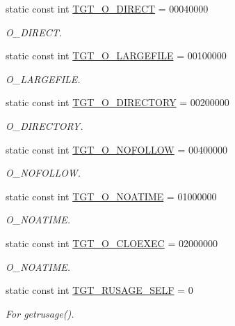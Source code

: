 \begin{DoxyCompactItemize}
static const int \hyperlink{classArmLinux64_ae5d685a6a2ee8c6fe0ede370f0bec588}{TGT\_\-O\_\-DIRECT} = 00040000
\begin{DoxyCompactList}\small\item\em O\_\-DIRECT. \item\end{DoxyCompactList}\item 
static const int \hyperlink{classArmLinux64_a9600e092a6309f94d92129ce5f85b945}{TGT\_\-O\_\-LARGEFILE} = 00100000
\begin{DoxyCompactList}\small\item\em O\_\-LARGEFILE. \item\end{DoxyCompactList}\item 
static const int \hyperlink{classArmLinux64_a1f10d158ad65ad6389078ba44629788a}{TGT\_\-O\_\-DIRECTORY} = 00200000
\begin{DoxyCompactList}\small\item\em O\_\-DIRECTORY. \item\end{DoxyCompactList}\item 
static const int \hyperlink{classArmLinux64_a9c27f68ab31ddfdd3e35800ea1f02a89}{TGT\_\-O\_\-NOFOLLOW} = 00400000
\begin{DoxyCompactList}\small\item\em O\_\-NOFOLLOW. \item\end{DoxyCompactList}\item 
static const int \hyperlink{classArmLinux64_a0ee8b0c23c2babc48e978e872b03c82c}{TGT\_\-O\_\-NOATIME} = 01000000
\begin{DoxyCompactList}\small\item\em O\_\-NOATIME. \item\end{DoxyCompactList}\item 
static const int \hyperlink{classArmLinux64_a34aa7ec867a12296e12a851c47fb56d4}{TGT\_\-O\_\-CLOEXEC} = 02000000
\begin{DoxyCompactList}\small\item\em O\_\-NOATIME. \item\end{DoxyCompactList}\item 
static const int \hyperlink{classArmLinux64_a9e303b6c52672934210e6db497f0da88}{TGT\_\-RUSAGE\_\-SELF} = 0
\begin{DoxyCompactList}\small\item\em For getrusage(). \item\end{DoxyCompactList}\item 

\end{DoxyCompactItemize}

